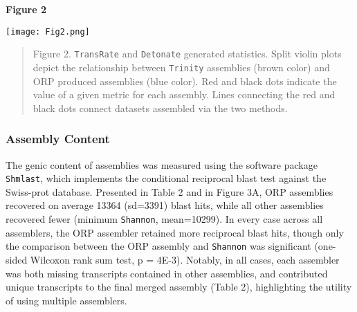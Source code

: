 \documentclass[10pt,letterpaper]{article}
\providecommand{\DIFaddbegin}{} %
\providecommand{\DIFaddend}{} %
\providecommand{\DIFdelbegin}{} %
\providecommand{\DIFdelend}{} %
\newcommand{\DIFscaledelfig}{0.5}
\newlength{\DIFdelgraphicswidth} %
\newlength{\DIFdelgraphicsheight} %
\newcommand{\DIFaddincludegraphics}[2][]{{\color{blue}\fbox{\DIFOincludegraphics[#1]{#2}}}} %
\newcommand{\DIFdelincludegraphics}[2][]{%
\sbox{\DIFdelgraphicsbox}{\DIFOincludegraphics[#1]{#2}}%
\settoboxwidth{\DIFdelgraphicswidth}{\DIFdelgraphicsbox} %
\settoboxtotalheight{\DIFdelgraphicsheight}{\DIFdelgraphicsbox} %
\scalebox{\DIFscaledelfig}{%
\parbox[b]{\DIFdelgraphicswidth}{\usebox{\DIFdelgraphicsbox}\\[-\baselineskip] \rule{\DIFdelgraphicswidth}{0em}}\llap{\resizebox{\DIFdelgraphicswidth}{\DIFdelgraphicsheight}{%
\setlength{\unitlength}{\DIFdelgraphicswidth}%
\begin{picture}(1,1)%
\thicklines\linethickness{2pt} %
{\color[rgb]{1,0,0}\put(0,0){\framebox(1,1){}}}%
{\color[rgb]{1,0,0}\put(0,0){\line( 1,1){1}}}%
{\color[rgb]{1,0,0}\put(0,1){\line(1,-1){1}}}%
\end{picture}%
}\hspace*{3pt}}} %
} %
\DeclareRobustCommand{\DIFaddbegin}{\DIFOaddbegin \let\includegraphics\DIFaddincludegraphics} %
\DeclareRobustCommand{\DIFaddend}{\DIFOaddend \let\includegraphics\DIFOincludegraphics} %
\DeclareRobustCommand{\DIFdelbegin}{\DIFOdelbegin \let\includegraphics\DIFdelincludegraphics} %
\DeclareRobustCommand{\DIFdelend}{\DIFOaddend \let\includegraphics\DIFOincludegraphics} %
\begin{document}
\textbf{\hypertarget{Figure 2}{Figure 2}} \\
\DIFdelbegin %
\DIFdelend \DIFaddbegin \centerline{\texttt{[image: Fig2.png]}}
\DIFaddend \begin{quote}
\small{Figure 2. \texttt{TransRate} and \texttt{Detonate} generated statistics. Split violin plots depict the relationship between \texttt{Trinity} assemblies (brown color) and ORP produced assemblies (blue color). Red and black dots indicate the value of a given metric for each assembly. Lines connecting the red and black dots connect datasets assembled via the two methods.}
\end{quote} 

\subsubsection{Assembly Content}

The genic content of assemblies was measured using the software package \texttt{Shmlast}, which implements the conditional reciprocal blast test against the Swiss-prot database. Presented in Table 2 and in Figure 3A, ORP assemblies recovered on average 13364 (sd=3391) blast hits, while all other assemblies recovered fewer (minimum \texttt{Shannon}, mean=10299). In every case across all assemblers, the ORP assembler retained more reciprocal blast hits, though only the comparison between the ORP assembly and \texttt{Shannon} was significant (one-sided Wilcoxon rank sum test, p = 4E-3). Notably, in all cases, each assembler was both missing transcripts contained in other assemblies, and contributed unique transcripts to the final merged assembly (Table 2), highlighting the utility of using multiple assemblers. \\
\end{document}
